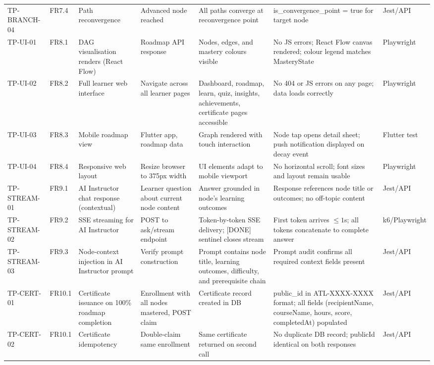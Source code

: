 \begin{longtable}{p{1.8cm}p{1.5cm}p{2.2cm}p{2.2cm}p{2.5cm}p{1.8cm}p{1.2cm}}
TP-BRANCH-04 & FR7.4 & Path reconvergence & Advanced node reached & All paths converge at reconvergence point & is\_convergence\_point = true for target node & Jest/API \\
TP-UI-01 & FR8.1 & DAG visualisation renders (React Flow) & Roadmap API response & Nodes, edges, and mastery colours visible & No JS errors; React Flow canvas rendered; colour legend matches MasteryState & Playwright \\
TP-UI-02 & FR8.2 & Full learner web interface & Navigate across all learner pages & Dashboard, roadmap, learn, quiz, insights, achievements, certificate pages accessible & No 404 or JS errors on any page; data loads correctly & Playwright \\
TP-UI-03 & FR8.3 & Mobile roadmap view & Flutter app, roadmap data & Graph rendered with touch interaction & Node tap opens detail sheet; push notification displayed on decay event & Flutter test \\
TP-UI-04 & FR8.4 & Responsive web layout & Resize browser to 375px width & UI elements adapt to mobile viewport & No horizontal scroll; font sizes and layout remain usable & Playwright \\
TP-STREAM-01 & FR9.1 & AI Instructor chat response (contextual) & Learner question about current node content & Answer grounded in node's learning outcomes & Response references node title or outcomes; no off-topic content & Jest/API \\
TP-STREAM-02 & FR9.2 & SSE streaming for AI Instructor & POST to ask/stream endpoint & Token-by-token SSE delivery; [DONE] sentinel closes stream & First token arrives $\le 1$s; all tokens concatenate to complete answer & k6/Playwright \\
TP-STREAM-03 & FR9.3 & Node-context injection in AI Instructor prompt & Verify prompt construction & Prompt contains node title, learning outcomes, difficulty, and prerequisite chain & Prompt audit confirms all required context fields present & Jest/API \\
TP-CERT-01 & FR10.1 & Certificate issuance on 100\% roadmap completion & Enrollment with all nodes mastered, POST claim & Certificate record created in DB & public\_id in ATL-XXXX-XXXX format; all fields (recipientName, courseName, hours, score, completedAt) populated & Jest/API \\
TP-CERT-02 & FR10.1 & Certificate idempotency & Double-claim same enrollment & Same certificate returned on second call & No duplicate DB record; publicId identical on both responses & Jest/API \\

\end{longtable}
